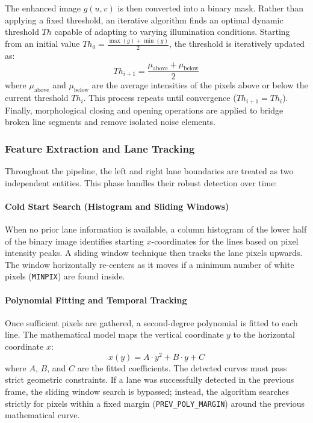 \documentclass[12pt,a4paper]{article}
\begin{document}
The enhanced image $g(u,v)$ is then converted into a binary mask. Rather than applying a fixed threshold, an iterative algorithm finds an optimal dynamic threshold $Th$ capable of adapting to varying illumination conditions. Starting from an initial value $Th_0 = \frac{\max(g) + \min(g)}{2}$, the threshold is iteratively updated as:
\begin{equation}
    Th_{i+1} = \frac{\mu_{\text{above}} + \mu_{\text{below}}}{2}
\end{equation}
where $\mu_{\text{above}}$ and $\mu_{\text{below}}$ are the average intensities of the pixels above or below the current threshold $Th_i$. This process repeats until convergence ($Th_{i+1} = Th_i$). Finally, morphological closing and opening operations are applied to bridge broken line segments and remove isolated noise elements.

\subsubsection{Feature Extraction and Lane Tracking}
Throughout the pipeline, the left and right lane boundaries are treated as two independent entities. This phase handles their robust detection over time:

\paragraph{Cold Start Search (Histogram and Sliding Windows)}
When no prior lane information is available, a column histogram of the lower half of the binary image identifies starting $x$-coordinates for the lines based on pixel intensity peaks. A sliding window technique then tracks the lane pixels upwards. The window horizontally re-centers as it moves if a minimum number of white pixels (\texttt{MINPIX}) are found inside.

\paragraph{Polynomial Fitting and Temporal Tracking}
Once sufficient pixels are gathered, a second-degree polynomial is fitted to each line. The mathematical model maps the vertical coordinate $y$ to the horizontal coordinate $x$:
\begin{equation}
    x(y) = A \cdot y^2 + B \cdot y + C
\end{equation}
where $A$, $B$, and $C$ are the fitted coefficients. The detected curves must pass strict geometric constraints. If a lane was successfully detected in the previous frame, the sliding window search is bypassed; instead, the algorithm searches strictly for pixels within a fixed margin (\texttt{PREV\_POLY\_MARGIN}) around the previous mathematical curve.
\end{document}
